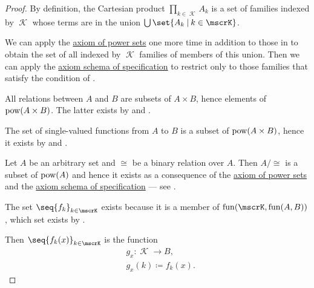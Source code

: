 \begin{proof}
   By definition, the Cartesian product \( \prod_{k \in \mscrK} A_k \) is a set of families indexed by \( \mscrK \) whose terms are in the union \( \bigcup\set{ A_k \given k \in \mscrK } \).

  We can apply the \hyperref[def:zfc/power_set]{axiom of power sets} one more time in addition to those in  to obtain the set of all indexed by \( \mscrK \) families of members of this union. Then we can apply the \hyperref[def:zfc/specification]{axiom schema of specification} to restrict only to those families that satisfy the condition of .

   All relations between \( A \) and \( B \) are subsets of \( A \times B \), hence elements of \( \operatorname{pow}(A \times B) \). The latter exists by  and .

   The set of single-valued functions from \( A \) to \( B \) is a subset of \( \operatorname{pow}(A \times B) \), hence it exists by  and .

   Let \( A \) be an arbitrary set and \( \cong \) be a binary relation over \( A \). Then \( A / {\cong} \) is a subset of \( \operatorname{pow}(A) \) and hence it exists as a consequence of the \hyperref[def:zfc/power_set]{axiom of power sets} and the \hyperref[def:zfc/specification]{axiom schema of specification} --- see .

   The set \( \seq{ f_k }_{k \in \mscrK} \) exists because it is a member of \( \fun(\mscrK, \fun(A, B)) \), which set exists by .

   Then \( \seq{ f_k(x) }_{k \in \mscrK} \) is the function
   \begin{equation*}
     \begin{aligned}
       &g_x: \mscrK \to B, \\
       &g_x(k) \coloneqq f_k(x).
     \end{aligned}
   \end{equation*}
\end{proof}

